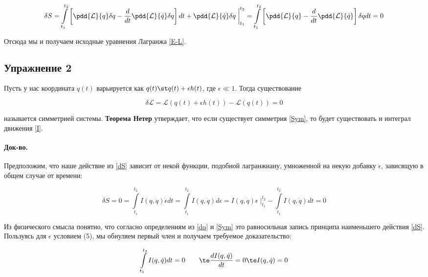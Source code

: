 \documentclass[12pt]{kiarticle}
\newcommand{\Ll}{\ensuremath{\mathcal{L}}}
\begin{document}
\begin{equation}\label{}
\delta S = \int\limits_{t_1}^{t_2} \left [ \pdd{\Ll}{q}\delta q - \dfrac{d}{dt} \pdd{\Ll}{\dot{q}} \delta q \right ] dt + \pdd{\Ll}{\dot{q}} \delta q \; \bigg |_{t_1}^{t_2} =  \int\limits_{t_1}^{t_2} \left [ \pdd{\Ll}{q} - \dfrac{d}{dt} \pdd{\Ll}{\dot{q}}  \right ]\delta q dt  = 0
\end{equation}

Отсюда мы и получаем исходные уравнения Лагранжа \eqref{E-L}. 


\subsection{Упражнение 2}

Пусть у нас координата $ q(t) $ варьируется как $ q(t) \st q(t) + \epsilon h(t) $, где $ \epsilon \ll 1 $. Тогда существование 

\begin{equation}\label{Sym}
\delta \Ll = \Ll (q(t) + \epsilon h(t)) - \Ll (q(t)) = 0 
\end{equation}

называется симметрией системы. \textbf{Теорема Нетер} утверждает, что если существует симметрия \eqref{Sym}, то будет существовать и интеграл движения \eqref{I}. 

\paragraph{Док-во.} Предположим, что наше действие из \eqref{dS} зависит от некой функции, подобной лагранжиану, умноженной на некую добавку $ \dot{\epsilon} $, зависящую в общем случае от времени:

\begin{equation}\label{}
\delta S = 0 = \int\limits_{t_1}^{t_2} I(q, \dot{q}) \dot{\epsilon} dt =  \int\limits_{t_1}^{t_2} I(q, \dot{q}) d\epsilon = I(q, \dot{q})\epsilon \; \bigg |_{t_1}^{t_2} -   \int\limits_{t_1}^{t_2} I(q, \dot{q}) dt = 0
\end{equation}

Из физического смысла понятно, что согласно определениям из \eqref{dq} и \eqref{Sym} это равносильная запись принципа наименьшего действия \eqref{dS}. Пользуясь для $ \epsilon $ условием (5), мы обнуляем первый член и получаем требуемое доказательство:

\begin{equation}\label{}
\int\limits_{t_1}^{t_2} I(q, \dot{q}) dt = 0 \qquad \te \dfrac{dI(q, \dot{q})}{dt} = 0 \te I(q, \dot{q} ) = 0
\end{equation}
\end{document}
